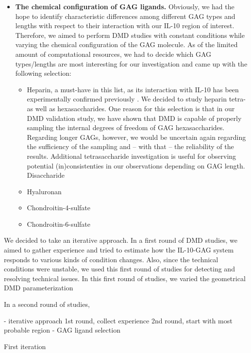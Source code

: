 \begin{itemize}
\item \textbf{The chemical configuration of GAG ligands.} Obviously, we had the
hope to identify characteristic differences among different GAG types and
lengths with respect to their interaction with our IL-10 region of interest.
Therefore, we aimed to perform DMD studies with constant conditions while
varying the chemical configuration of the GAG molecule. As of the limited amount
of computational resources, we had to decide which GAG types/lengths are most
interesting for our investigation and came up with the following selection:
\begin{itemize}
\item Heparin, a must-have in this list, as its interaction with IL-10 has been
experimentally confirmed previously \cite{salek_ardakani_2000}. We decided to
study heparin tetra- as well as hexasaccharides. One reason for this selection
is that in our DMD validation study, we have shown that DMD is capable of
properly sampling the internal degrees of freedom of GAG hexasaccharides.
Regarding longer GAGs, however, we would be uncertain again regarding the
sufficiency of the sampling and -- with that -- the reliability of the results.
Additional tetrasaccharide investigation is useful for observing potential
(in)consistenties in our observations depending on GAG length. Disaccharide

\item Hyaluronan
\item Chondroitin-4-sulfate
\item Chondroitin-6-sulfate
\end{itemize}



\end{itemize}

We decided to take an iterative approach. In a first round of DMD studies, we
aimed to gather experience and tried to estimate how the IL-10-GAG system
responds to various kinds of condition changes. Also, since the technical
conditions were unstable, we used this first round of studies for detecting
and resolving technical issues. In this first round of studies, we varied
the geometrical DMD parameterization


In a second round of studies,


        - iterative approach
            1st round, collect experience
            2nd round, start with most probable region
        - GAG ligand selection

First iteration


